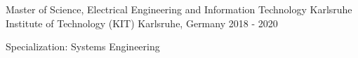 

\begin{cventries}

   \cventry
    {Master of Science, Electrical Engineering and Information Technology}
    {Karlsruhe Institute of Technology (KIT)}
    {Karlsruhe, Germany}
    {2018 - 2020}
    {
      \begin{cvitems} %
        \item {Specialization: Systems Engineering}
      \end{cvitems}
    }

\end{cventries}

